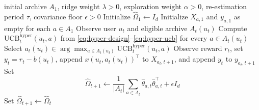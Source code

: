 \documentclass{article} %
\begin{document}
\begin{algorithm}[t]
\caption{Hyper-Ridge PersonalEvo routing}
\label{alg:hyper-ridge-summary}
\begin{algorithmic}[1]
\Require initial archive \(A_1\), ridge weight \(\lambda>0\), exploration weight \(\alpha>0\), re-estimation period \(\tau\), covariance floor \(\epsilon>0\)
\State Initialize \(\widehat{\Omega}_1 \gets I_d\)
\State Initialize \(X_{a,1}\) and \(y_{a,1}\) as empty for each \(a\in A_1\)
    \State Observe user \(u_t\) and eligible archive \(A_t(u_t)\)
    \State Compute \(\mathrm{UCB}_{t}^{\mathrm{hyper}}(u_t,a)\) from \eqref{eq:hyper-design}--\eqref{eq:hyper-ucb} for every \(a\in A_t(u_t)\)
    \State Select \(a_t(u_t)\in \arg\max_{a\in A_t(u_t)}\mathrm{UCB}_{t}^{\mathrm{hyper}}(u_t,a)\)
    \State Observe reward \(r_t\), set \(y_t=r_t-b(u_t)\), append \(x(u_t,a_t(u_t))^\top\) to \(X_{a_t,t+1}\), and append \(y_t\) to \(y_{a_t,t+1}\)
        \State Set
        \begin{equation}
        \widehat{\Omega}_{t+1}
        \gets
        \frac{1}{|A_t|}
        \sum_{a\in A_t}
        \widehat{\theta}_{a,t}\widehat{\theta}_{a,t}^{\top}
        +
        \epsilon I_d
        \end{equation}
    \Else
        \State Set \(\widehat{\Omega}_{t+1}\gets \widehat{\Omega}_t\)
    \EndIf
\EndFor
\end{algorithmic}
\end{algorithm}
\end{document}
